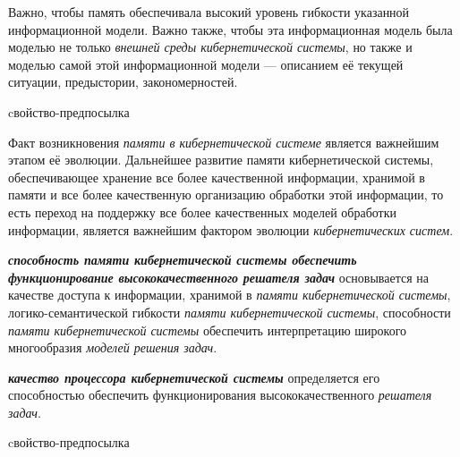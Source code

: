 Важно, чтобы память обеспечивала высокий уровень гибкости указанной информационной модели. Важно также, чтобы эта информационная модель была моделью не только \textit{внешней среды кибернетической системы}, но также и моделью самой этой информационной модели --- описанием её текущей ситуации, предыстории, закономерностей.

\begin{SCn}
\begin{scnrelfromlist}{cвойство-предпосылка}
\end{scnrelfromlist}
\end{SCn}

Факт возникновения \textit{памяти в кибернетической системе} является важнейшим этапом её эволюции.
Дальнейшее развитие памяти кибернетической системы, обеспечивающее хранение все более качественной информации, хранимой в памяти и все более качественную организацию обработки этой информации, то есть переход на поддержку все более качественных моделей обработки информации, является важнейшим фактором эволюции \textit{кибернетических систем}.

\textbf{\textit{способность \textit{памяти кибернетической системы} обеспечить функционирование высококачественного \textit{решателя задач}}} основывается на качестве доступа к информации, хранимой в \textit{памяти кибернетической системы}, логико-семантической гибкости \textit{памяти кибернетической системы}, способности \textit{памяти кибернетической системы} обеспечить интерпретацию широкого многообразия \textit{моделей решения задач}.

\textbf{\textit{качество процессора кибернетической системы}} определяется его способностью обеспечить функционирования высококачественного \textit{решателя задач}.

\begin{SCn}
\begin{scnrelfromlist}{cвойство-предпосылка}
\end{scnrelfromlist}
\end{SCn}

